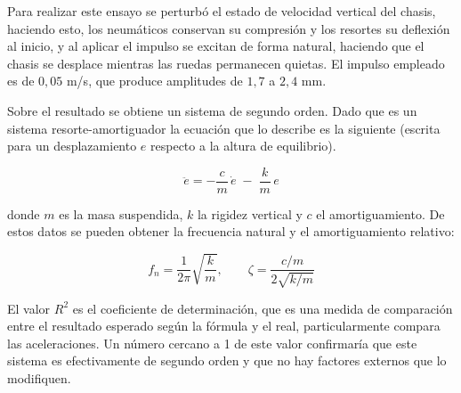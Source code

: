 Para realizar este ensayo se perturbó el estado de velocidad vertical del chasis, haciendo esto, los neumáticos conservan su compresión y los resortes su deflexión al inicio, y al aplicar el impulso se excitan de forma natural, haciendo que el chasis se desplace mientras las ruedas permanecen quietas. El impulso empleado es de $0{,}05$ m/s, que produce amplitudes de $1{,}7$ a $2{,}4$ mm.

Sobre el resultado se obtiene un sistema de segundo orden. Dado que es un sistema resorte-amortiguador la ecuación que lo describe es la siguiente (escrita para un desplazamiento $e$ respecto a la altura de equilibrio).

\begin{equation}
	\ddot{e} = -\frac{c}{m}\,\dot{e} \;-\; \frac{k}{m}\,e
	\label{eq:segundo-orden}
\end{equation}

donde $m$ es la masa suspendida, $k$ la rigidez vertical y $c$ el amortiguamiento. De estos datos se pueden obtener la frecuencia natural y el amortiguamiento relativo:

\begin{equation}
	f_n = \frac{1}{2\pi}\sqrt{\frac{k}{m}},
	\qquad
	\zeta = \frac{c/m}{2\sqrt{k/m}}
	\label{eq:fn-zeta}
\end{equation}

El valor $R^2$ es el coeficiente de determinación, que es una medida de comparación entre el resultado esperado según la fórmula y el real, particularmente compara las aceleraciones. Un número cercano a 1 de este valor confirmaría que este sistema es efectivamente de segundo orden y que no hay factores externos que lo modifiquen.



